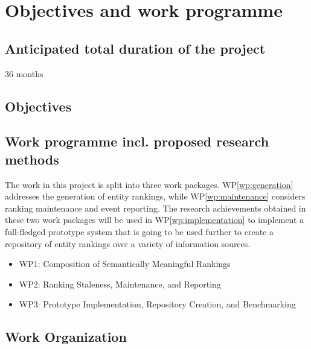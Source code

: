 \newpage

\section{Objectives and work programme}

	\subsection{Anticipated total duration of the project}
		36 months
\subsection{Objectives}


\subsection{Work programme incl. proposed research methods}

The work in this project is split into three work packages. WP\ref{wp:generation}   addresses the
generation of entity rankings, while WP\ref{wp:maintenance}  considers ranking maintenance and event reporting.
The research achievements obtained in these two work packages will be used in WP\ref{wp:implementation}  to implement a full-fledged
prototype system that is going to be used further to create a repository of entity rankings over a variety of information sources.

 
\begin{itemize}
\item WP1: Composition of Semantically Meaningful Rankings
\item WP2: Ranking Staleness, Maintenance, and Reporting
\item WP3: Prototype Implementation, Repository Creation, and Benchmarking 
\end{itemize}


\label{wp:generation}



\label{wp:maintenance}


\label{wp:implementation}


\subsection*{Work Organization}


